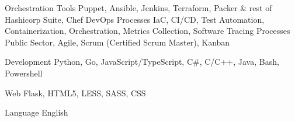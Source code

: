 

\begin{cvskills}

	\cvskill
	{Orchestration Tools}
	{Puppet, Ansible, Jenkins, Terraform, Packer \& rest of Hashicorp Suite, Chef}
	\cvskill
	{DevOps Processes}
	{IaC, CI/CD, Test Automation, Containerization, Orchestration, Metrics Collection, Software Tracing}
	\cvskill
	{Processes} %
	{Public Sector, Agile, Scrum (Certified Scrum Master), Kanban} %

	\cvskill
	{Development} %
	{Python, Go, JavaScript/TypeScript, C\#, C/C++, Java, Bash, Powershell} %

	\cvskill
	{Web} %
	{Flask, HTML5, LESS, SASS, CSS} %

	\cvskill
	{Language} %
	{English} %

\end{cvskills}
